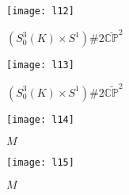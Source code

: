 \documentclass[11pt]{amsart}
\begin{document}
   \begin{figure}[ht]  \begin{center}  
\texttt{[image: l12]}   
\caption{$(S^{3}_{0}(K) \times S^{1} )\# 2\bar{{{\mathbb C}}{{\mathbb P}}}^2$} 
\end{center}
\end{figure} 

   \begin{figure}[ht]  \begin{center}  
\texttt{[image: l13]}   
\caption{$(S^{3}_{0}(K) \times S^{1} )\# 2\bar{{{\mathbb C}}{{\mathbb P}}}^2$} 
\end{center}
\end{figure} 

   \begin{figure}[ht]  \begin{center}  
\texttt{[image: l14]}   
\caption{ $M$} 
\end{center}
\end{figure} 

   \begin{figure}[ht]  \begin{center}  
\texttt{[image: l15]}   
\caption{ $M$} 
\end{center}
\end{figure} 

\clearpage 
\end{document}
